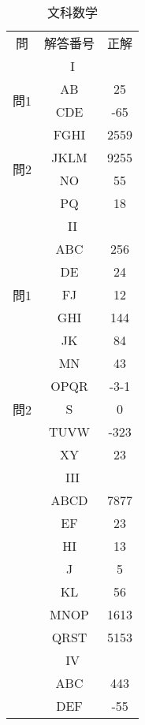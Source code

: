 \documentclass{jsarticle}
\begin{document}
\begin{CJK}{UTF8}{min}

\begin{table}[htbp]
\centering
\renewcommand{\arraystretch}{1.1}
\begin{minipage}[t]{0.48\textwidth}
\centering
\caption*{文科数学}
\begin{tabular}{|c|c|c|}
\hline
\multirow{2}{*}{問} & \multirow{2}{*}{解答番号} & \multirow{2}{*}{正解} \\
 &  & \\
\hline
\multicolumn{3}{|c|}{I} \\
\hline
\multirow{2}{*}{問1} 
 & \textsf{AB} & 25 \\
 & \textsf{CDE} & -65 \\

\hline
\multirow{4}{*}{問2} 
 & \textsf{FGHI} & 2559 \\
 & \textsf{JKLM} & 9255 \\
 & \textsf{NO} & 55 \\
 & \textsf{PQ} & 18 \\
\hline
\multicolumn{3}{|c|}{II} \\
\hline
\multirow{5}{*}{問1} 
 & \textsf{ABC} & 256 \\
 & \textsf{DE} & 24 \\
 & \textsf{FJ} & 12 \\
 & \textsf{GHI} & 144 \\
 & \textsf{JK} & 84 \\
\hline
\multirow{5}{*}{問2}
 & \textsf{MN} & 43 \\
 & \textsf{OPQR} & -3-1 \\
 & \textsf{S} & 0 \\
 & \textsf{TUVW} & -323 \\
 & \textsf{XY} & 23 \\
\hline
\multicolumn{3}{|c|}{III} \\
\hline
 & \textsf{ABCD} & 7877 \\
 & \textsf{EF} & 23 \\
 & \textsf{HI} & 13 \\
 & \textsf{J} & 5 \\
 & \textsf{KL} & 56 \\
 & \textsf{MNOP} & 1613 \\
 & \textsf{QRST} & 5153 \\
\hline
\multicolumn{3}{|c|}{IV} \\
\hline
 & \textsf{ABC} & 443 \\
 & \textsf{DEF} & -55 \\

\end{tabular}
\end{minipage}
\end{table}
\end{CJK}
\end{document}
